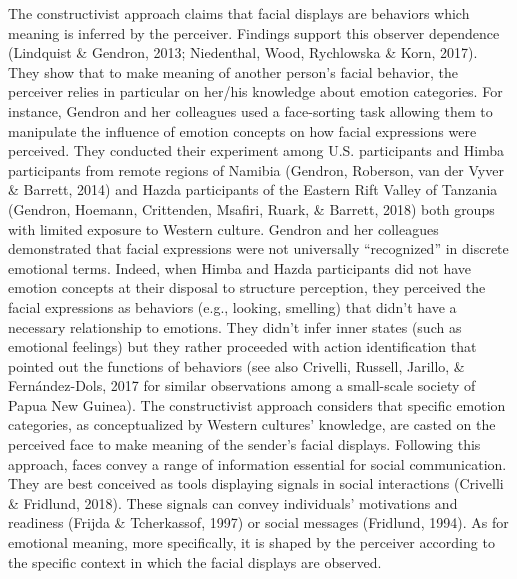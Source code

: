 \documentclass[man]{apa6}
\begin{document}
The constructivist approach claims that facial displays are behaviors which meaning is inferred by the perceiver. Findings support this observer dependence (Lindquist \& Gendron, 2013; Niedenthal, Wood, Rychlowska \& Korn, 2017). They show that to make meaning of another person's facial behavior, the perceiver relies in particular on her/his knowledge about emotion categories. For instance, Gendron and her colleagues used a face-sorting task allowing them to manipulate the influence of emotion concepts on how facial expressions were perceived. They conducted their experiment among U.S. participants and Himba participants from remote regions of Namibia (Gendron, Roberson, van der Vyver \& Barrett, 2014) and Hazda participants of the Eastern Rift Valley of Tanzania (Gendron, Hoemann, Crittenden, Msafiri, Ruark, \& Barrett, 2018) both groups with limited exposure to Western culture. Gendron and her colleagues demonstrated that facial expressions were not universally \enquote{recognized} in discrete emotional terms. Indeed, when Himba and Hazda participants did not have emotion concepts at their disposal to structure perception, they perceived the facial expressions as behaviors (e.g., looking, smelling) that didn't have a necessary relationship to emotions. They didn't infer inner states (such as emotional feelings) but they rather proceeded with action identification that pointed out the functions of behaviors (see also Crivelli, Russell, Jarillo, \& Fernández-Dols, 2017 for similar observations among a small-scale society of Papua New Guinea). The constructivist approach considers that specific emotion categories, as conceptualized by Western cultures' knowledge, are casted on the perceived face to make meaning of the sender's facial displays. Following this approach, faces convey a range of information essential for social communication. They are best conceived as tools displaying signals in social interactions (Crivelli \& Fridlund, 2018). These signals can convey individuals' motivations and readiness (Frijda \& Tcherkassof, 1997) or social messages (Fridlund, 1994). As for emotional meaning, more specifically, it is shaped by the perceiver according to the specific context in which the facial displays are observed.
\end{document}
